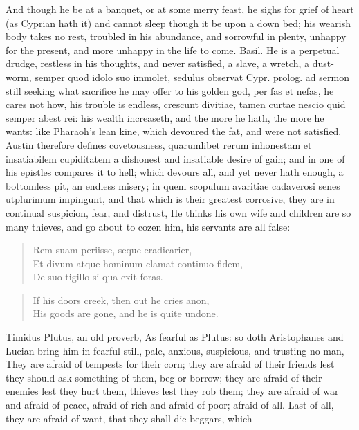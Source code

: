 {And though he be at a banquet, or at some merry feast, he sighs for
grief of heart (as Cyprian hath it) and cannot sleep though it be
upon a down bed; his wearish body takes no rest, troubled in his
abundance, and sorrowful in plenty, unhappy for the present, and more
unhappy in the life to come. Basil. He is a perpetual drudge,
restless in his thoughts, and never satisfied, a slave, a wretch,
a dust-worm, semper quod idolo suo immolet, sedulus observat Cypr.
prolog. ad sermon still seeking what sacrifice he may offer to his
golden god, per fas et nefas, he cares not how, his trouble is endless,
crescunt divitiae, tamen curtae nescio quid semper abest rei: his
wealth increaseth, and the more he hath, the more he wants: like
Pharaoh's lean kine, which devoured the fat, and were not satisfied.
Austin therefore defines covetousness, quarumlibet rerum
inhonestam et insatiabilem cupiditatem a dishonest and insatiable
desire of gain; and in one of his epistles compares it to hell;
which devours all, and yet never hath enough, a bottomless pit,
an endless misery; in quem scopulum avaritiae cadaverosi senes
utplurimum impingunt, and that which is their greatest corrosive, they
are in continual suspicion, fear, and distrust, He thinks his own wife
and children are so many thieves, and go about to cozen him, his
servants are all false:
%
\begin{verse}
\textlatin{Rem suam periisse, seque eradicarier},\\
\textlatin{Et divum atque hominum clamat continuo fidem},\\
\textlatin{De suo tigillo si qua exit foras}.
\end{verse}
\translationrule
\begin{verse}
If his doors creek, then out he cries anon,\\
His goods are gone, and he is quite undone.
\end{verse}
%
Timidus Plutus, an old proverb, As fearful as Plutus: so doth
Aristophanes and Lucian bring him in fearful still, pale, anxious,
suspicious, and trusting no man, They are afraid of tempests for
their corn; they are afraid of their friends lest they should ask
something of them, beg or borrow; they are afraid of their enemies lest
they hurt them, thieves lest they rob them; they are afraid of war and
afraid of peace, afraid of rich and afraid of poor; afraid of all. Last
of all, they are afraid of want, that they shall die beggars, which
}
